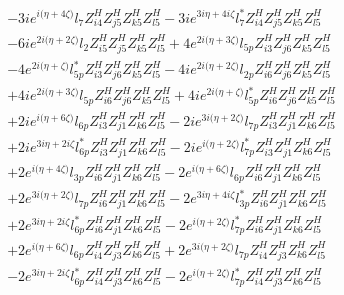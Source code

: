 \begin{align}
 &-3 i e^{i \Big(\eta +4 \zeta \Big)} l_7 Z_{{i 4}}^{H} Z_{{j 5}}^{H} Z_{{k 5}}^{H} Z_{{l 5}}^{H} -3 i e^{3 i \eta +4 i \zeta } l_7^* Z_{{i 4}}^{H} Z_{{j 5}}^{H} Z_{{k 5}}^{H} Z_{{l 5}}^{H} \nonumber \\ 
 &-6 i e^{2 i \Big(\eta +2 \zeta \Big)} l_2 Z_{{i 5}}^{H} Z_{{j 5}}^{H} Z_{{k 5}}^{H} Z_{{l 5}}^{H} +4 e^{2 i \Big(\eta +3 \zeta \Big)} l_{5p} Z_{{i 3}}^{H} Z_{{j 6}}^{H} Z_{{k 5}}^{H} Z_{{l 5}}^{H} \nonumber \\ 
 &-4 e^{2 i \Big(\eta +\zeta \Big)} l_{5p}^* Z_{{i 3}}^{H} Z_{{j 6}}^{H} Z_{{k 5}}^{H} Z_{{l 5}}^{H} -4 i e^{2 i \Big(\eta +2 \zeta \Big)} l_{2p} Z_{{i 6}}^{H} Z_{{j 6}}^{H} Z_{{k 5}}^{H} Z_{{l 5}}^{H} \nonumber \\ 
 &+4 i e^{2 i \Big(\eta +3 \zeta \Big)} l_{5p} Z_{{i 6}}^{H} Z_{{j 6}}^{H} Z_{{k 5}}^{H} Z_{{l 5}}^{H} +4 i e^{2 i \Big(\eta +\zeta \Big)} l_{5p}^* Z_{{i 6}}^{H} Z_{{j 6}}^{H} Z_{{k 5}}^{H} Z_{{l 5}}^{H} \nonumber \\ 
 &+2 i e^{i \Big(\eta +6 \zeta \Big)} l_{6p} Z_{{i 3}}^{H} Z_{{j 1}}^{H} Z_{{k 6}}^{H} Z_{{l 5}}^{H} -2 i e^{3 i \Big(\eta +2 \zeta \Big)} l_{7p} Z_{{i 3}}^{H} Z_{{j 1}}^{H} Z_{{k 6}}^{H} Z_{{l 5}}^{H} \nonumber \\ 
 &+2 i e^{3 i \eta +2 i \zeta } l_{6p}^* Z_{{i 3}}^{H} Z_{{j 1}}^{H} Z_{{k 6}}^{H} Z_{{l 5}}^{H} -2 i e^{i \Big(\eta +2 \zeta \Big)} l_{7p}^* Z_{{i 3}}^{H} Z_{{j 1}}^{H} Z_{{k 6}}^{H} Z_{{l 5}}^{H} \nonumber \\ 
 &+2 e^{i \Big(\eta +4 \zeta \Big)} l_{3p} Z_{{i 6}}^{H} Z_{{j 1}}^{H} Z_{{k 6}}^{H} Z_{{l 5}}^{H} -2 e^{i \Big(\eta +6 \zeta \Big)} l_{6p} Z_{{i 6}}^{H} Z_{{j 1}}^{H} Z_{{k 6}}^{H} Z_{{l 5}}^{H} \nonumber \\ 
 &+2 e^{3 i \Big(\eta +2 \zeta \Big)} l_{7p} Z_{{i 6}}^{H} Z_{{j 1}}^{H} Z_{{k 6}}^{H} Z_{{l 5}}^{H} -2 e^{3 i \eta +4 i \zeta } l_{3p}^* Z_{{i 6}}^{H} Z_{{j 1}}^{H} Z_{{k 6}}^{H} Z_{{l 5}}^{H} \nonumber \\ 
 &+2 e^{3 i \eta +2 i \zeta } l_{6p}^* Z_{{i 6}}^{H} Z_{{j 1}}^{H} Z_{{k 6}}^{H} Z_{{l 5}}^{H} -2 e^{i \Big(\eta +2 \zeta \Big)} l_{7p}^* Z_{{i 6}}^{H} Z_{{j 1}}^{H} Z_{{k 6}}^{H} Z_{{l 5}}^{H} \nonumber \\ 
 &+2 e^{i \Big(\eta +6 \zeta \Big)} l_{6p} Z_{{i 4}}^{H} Z_{{j 3}}^{H} Z_{{k 6}}^{H} Z_{{l 5}}^{H} +2 e^{3 i \Big(\eta +2 \zeta \Big)} l_{7p} Z_{{i 4}}^{H} Z_{{j 3}}^{H} Z_{{k 6}}^{H} Z_{{l 5}}^{H} \nonumber \\ 
 &-2 e^{3 i \eta +2 i \zeta } l_{6p}^* Z_{{i 4}}^{H} Z_{{j 3}}^{H} Z_{{k 6}}^{H} Z_{{l 5}}^{H} -2 e^{i \Big(\eta +2 \zeta \Big)} l_{7p}^* Z_{{i 4}}^{H} Z_{{j 3}}^{H} Z_{{k 6}}^{H} Z_{{l 5}}^{H} \nonumber \\ 

\end{align}
